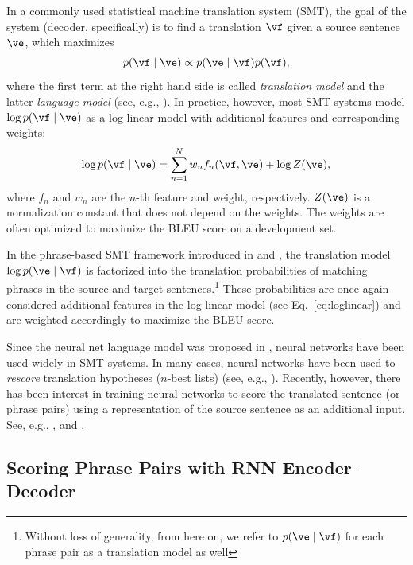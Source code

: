 In a commonly used statistical machine translation system (SMT), the goal of the
system (decoder, specifically) is to find a translation $\vf$ given a source
sentence $\ve$, which maximizes
\begin{align*}
    p(\vf \mid \ve) \propto  p(\ve \mid \vf) p(\vf),
\end{align*}
where the first term at the right hand side is called \textit{translation model}
and the latter \textit{language model} (see, e.g., \mbox{\cite{Koehn2005}}).
In practice, however, most SMT systems model $\log p(\vf \mid \ve)$ as a log-linear model with
additional features and corresponding weights:
\begin{align}
    \label{eq:loglinear}
    \log p(\vf \mid \ve) = \sum_{n=1}^N w_n f_n(\vf, \ve) + \log Z(\ve),
\end{align}
where $f_n$ and $w_n$ are the $n$-th feature and weight, respectively. $Z(\ve)$
is a normalization constant that does not depend on the weights. The weights are
often optimized to maximize the BLEU score on a development set.

In the phrase-based SMT framework introduced in \mbox{\cite{Koehn2003}} and
\mbox{\cite{Marcu2002}}, the translation model \mbox{$\log p(\ve\mid\vf)$} is factorized
into the translation probabilities of matching phrases in the source and target
sentences.\footnote{
    Without loss of generality, from here on, we refer to $p(\ve \mid \vf)$ for
    each phrase pair as a translation model as well
} These probabilities are once again considered additional features
in the log-linear model (see Eq.~\eqref{eq:loglinear}) and are weighted
accordingly to maximize the BLEU score.

Since the neural net language model was proposed in
\mbox{\cite{Bengio2003lm}}, neural networks have been used widely in SMT systems.
In many cases, neural networks have been used to \textit{rescore} translation
hypotheses ($n$-best lists) (see, e.g., \mbox{\cite{Schwenk2006}}). Recently,
however, there has been interest in training neural networks to score the
translated sentence (or phrase pairs) using a representation of the source
sentence as an additional input. See, e.g., \mbox{\cite{Schwenk2012}},
\mbox{\cite{Son2012}} and \mbox{\cite{Zou2013}}. 


\subsection{Scoring Phrase Pairs with RNN Encoder--Decoder}
\label{sec:score_rnn}

